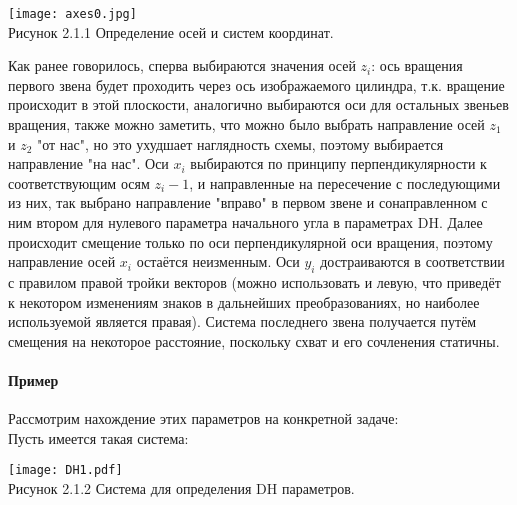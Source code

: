 \begin{center}
    \texttt{[image: axes0.jpg]}\\
    Рисунок 2.1.1 Определение осей и систем координат.
\end{center}

\hspace*{\parindent}Как ранее говорилось, сперва выбираются значения осей $z_i$: ось вращения первого звена будет проходить через ось изображаемого цилиндра, т.к. вращение происходит в этой плоскости, аналогично выбираются оси для остальных звеньев вращения, также можно заметить, что можно было выбрать направление осей $z_1$ и $z_2$ "от нас", но это  ухудшает наглядность схемы, поэтому выбирается направление "на нас". Оси $x_i$ выбираются по принципу перпендикулярности к соответствующим осям $z_i-1$, и направленные на пересечение с последующими из них, так выбрано направление "вправо" в первом звене и сонаправленном с ним втором для нулевого параметра начального угла в параметрах DH. Далее происходит смещение только по оси перпендикулярной оси вращения, поэтому направление осей $x_i$ остаётся неизменным. Оси $y_i$ достраиваются в соответствии с правилом правой тройки векторов (можно использовать и левую, что приведёт к некотором изменениям знаков в дальнейших преобразованиях, но наиболее используемой является правая). Система последнего звена получается путём смещения на некоторое расстояние, поскольку схват и его сочленения статичны.\\
 
 \paragraph*{Пример\\}
 
\hspace*{\parindent}Рассмотрим нахождение этих параметров на конкретной задаче:\\

Пусть имеется такая система:\\
\begin{center}
    \texttt{[image: DH1.pdf]}\\
    Рисунок 2.1.2 Система для определения DH параметров.\\
\end{center}


